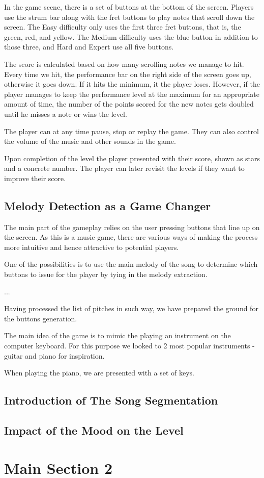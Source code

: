 In the game scene, there is a set of buttons at the bottom of the screen. Players use the strum bar along with the fret buttons to play notes that scroll down the screen. The Easy difficulty only uses the first three fret buttons, that is, the green, red, and yellow. The Medium difficulty uses the blue button in addition to those three, and Hard and Expert use all five buttons.

The score is calculated based on how many scrolling notes we manage to hit. Every time we hit, the performance bar on the right side of the screen goes up, otherwise it goes down. If it hits the minimum, it the player loses. However, if the player manages to keep the performance level at the maximum for an appropriate amount of time, the number of the points scored for the new notes gets doubled until he misses a note or wins the level.

The player can at any time pause, stop or replay the game. They can also control the volume of the music and other sounds in the game. 

Upon completion of the level the player presented with their score, shown as stars and a concrete number. The player can later revisit the levels if they want to improve their score. 

\vspace{10pt}

\subsection{Melody Detection as a Game Changer}

The main part of the gameplay relies on the user pressing buttons that line up on the screen. As this is a music game, there are various ways of making the process more intuitive and hence attractive to potential players. 

One of the possibilities is to use the main melody of the song to determine which buttons to issue for the player by tying in the melody extraction.


...

Having processed the list of pitches in such way, we have prepared the ground for the buttons generation.

The main idea of the game is to mimic the playing an instrument on the computer keyboard. For this purpose we looked to 2 most popular instruments - guitar and piano for inspiration. 

When playing the piano, we are presented with a set of keys. 

\vspace{10pt}

\subsection{Introduction of The Song Segmentation}

\vspace{10pt}

\subsection{Impact of the Mood on the Level}

\vspace{20pt}


\section{Main Section 2}
